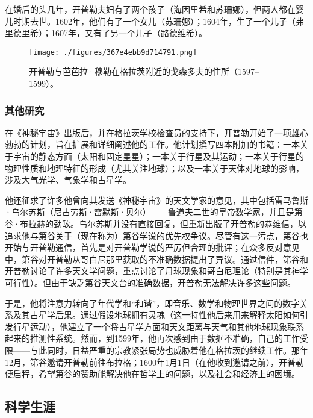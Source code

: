 在婚后的头几年，开普勒夫妇有了两个孩子（海因里希和苏珊娜），但两人都在婴儿时期去世。1602年，他们有了一个女儿（苏珊娜）；1604年，生了一个儿子（弗里德里希）；1607年，又有了另一个儿子（路德维希）。
\begin{figure}[ht]
\centering
\texttt{[image: ./figures/367e4ebb9d714791.png]}
\caption{开普勒与芭芭拉·穆勒在格拉茨附近的戈森多夫的住所（1597–1599）。} \label{fig_KPL1_5}
\end{figure}
\subsubsection{其他研究}  
在《神秘宇宙》出版后，并在格拉茨学校检查员的支持下，开普勒开始了一项雄心勃勃的计划，旨在扩展和详细阐述他的工作。他计划撰写四本附加的书籍：一本关于宇宙的静态方面（太阳和固定星星）；一本关于行星及其运动；一本关于行星的物理性质和地理特征的形成（尤其关注地球）；以及一本关于天体对地球的影响，涉及大气光学、气象学和占星学。

他还征求了许多他曾向其发送《神秘宇宙》的天文学家的意见，其中包括雷马鲁斯·乌尔苏斯（尼古劳斯·雷默斯·贝尔）——鲁道夫二世的皇帝数学家，并且是第谷·布拉赫的劲敌。乌尔苏斯并没有直接回复，但重新出版了开普勒的恭维信，以追求他与第谷关于（现在称为）第谷学说的优先权争议。尽管有这一污点，第谷也开始与开普勒通信，首先是对开普勒学说的严厉但合理的批评；在众多反对意见中，第谷对开普勒从哥白尼那里获取的不准确数据提出了异议。通过信件，第谷和开普勒讨论了许多天文学问题，重点讨论了月球现象和哥白尼理论（特别是其神学可行性）。但由于缺乏第谷天文台的准确数据，开普勒无法解决许多这些问题。

于是，他将注意力转向了年代学和“和谐”，即音乐、数学和物理世界之间的数字关系及其占星学后果。通过假设地球拥有灵魂（这一特性他后来用来解释太阳如何引发行星运动），他建立了一个将占星学方面和天文距离与天气和其他地球现象联系起来的推测性系统。然而，到1599年，他再次感到由于数据不准确，自己的工作受限——与此同时，日益严重的宗教紧张局势也威胁着他在格拉茨的继续工作。那年12月，第谷邀请开普勒前往布拉格；1600年1月1日（在他收到邀请之前），开普勒便启程，希望第谷的赞助能解决他在哲学上的问题，以及社会和经济上的困境。
\subsection{科学生涯}  
